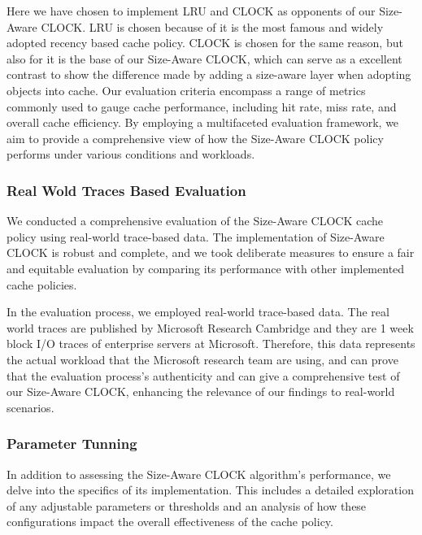 \documentclass[conference]{IEEEtran}
\begin{document}
Here we have chosen to implement LRU and CLOCK as opponents of our Size-Aware CLOCK. LRU is chosen because of it is the most famous and widely adopted recency based cache policy. CLOCK is chosen for the same reason, but also for it is the base of our Size-Aware CLOCK, which can serve as a excellent contrast to show the difference made by adding a size-aware layer when adopting objects into cache. Our evaluation criteria encompass a range of metrics commonly used to gauge cache performance, including hit rate, miss rate, and overall cache efficiency. By employing a multifaceted evaluation framework, we aim to provide a comprehensive view of how the Size-Aware CLOCK policy performs under various conditions and workloads.

\subsubsection{Real Wold Traces Based Evaluation}
We conducted a comprehensive evaluation of the Size-Aware CLOCK cache policy using real-world trace-based data. The implementation of Size-Aware CLOCK is robust and complete, and we took deliberate measures to ensure a fair and equitable evaluation by comparing its performance with other implemented cache policies.

In the evaluation process, we employed real-world trace-based data. The real world traces are published by Microsoft Research Cambridge and they are 1 week block I/O traces of enterprise servers at Microsoft. Therefore, this data represents the actual workload that the Microsoft research team are using, and can prove that the evaluation process's authenticity and can give a comprehensive test of our Size-Aware CLOCK, enhancing the relevance of our findings to real-world scenarios.

\subsubsection{Parameter Tunning}
In addition to assessing the Size-Aware CLOCK algorithm's performance, we delve into the specifics of its implementation. This includes a detailed exploration of any adjustable parameters or thresholds and an analysis of how these configurations impact the overall effectiveness of the cache policy.

\end{document}
